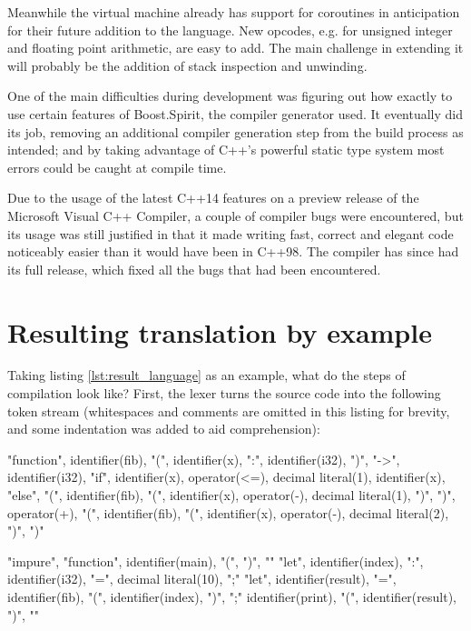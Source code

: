 Meanwhile the virtual machine already has support for coroutines in anticipation for their future addition to the language. New opcodes, e.g. for unsigned integer and floating point arithmetic, are easy to add. The main challenge in extending it will probably be the addition of stack inspection and unwinding.

One of the main difficulties during development was figuring out how exactly to use certain features of Boost.Spirit, the compiler generator used. It eventually did its job, removing an additional compiler generation step from the build process as intended; and by taking advantage of C++'s powerful static type system most errors could be caught at compile time.

Due to the usage of the latest C++14 features on a preview release of the Microsoft Visual C++ Compiler, a couple of compiler bugs were encountered, but its usage was still justified in that it made writing fast, correct and elegant code noticeably easier than it would have been in C++98. The compiler has since had its full release, which fixed all the bugs that had been encountered.


\section{Resulting translation by example}

Taking listing \ref{lst:result_language} as an example, what do the steps of compilation look like? First, the lexer turns the source code into the following token stream (whitespaces and comments are omitted in this listing for brevity, and some indentation was added to aid comprehension):

\begin{codelisting}[caption="Abridged tokens of listing \ref{lst:result_language}"]
"function", identifier(fib), "(", identifier(x), ":", identifier(i32), ")", "->", identifier(i32),
    "if", identifier(x), operator(<=), decimal literal(1),
        identifier(x),
    "else",
        "(", identifier(fib), "(", identifier(x), operator(-), decimal literal(1), ")", ")", operator(+), "(", identifier(fib), "(", identifier(x), operator(-), decimal literal(2), ")", ")"

"impure", "function", identifier(main), "(", ")",
"{"
    "let", identifier(index), ":", identifier(i32), "=", decimal literal(10), ";"
    "let", identifier(result), "=", identifier(fib), "(", identifier(index), ")", ";"
    identifier(print), "(", identifier(result), ")",
"}"
\end{codelisting}

